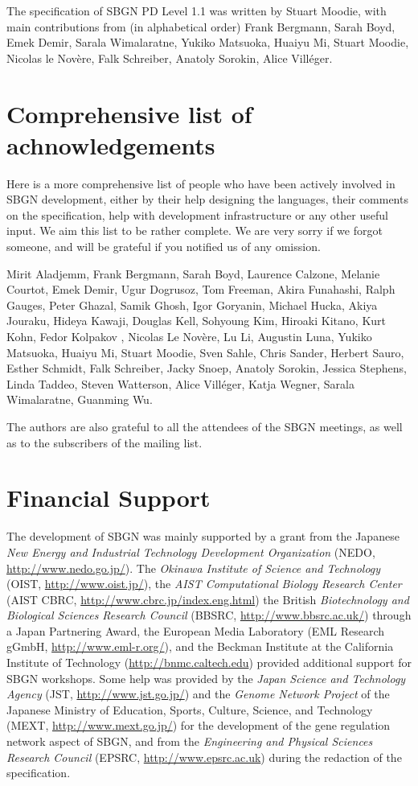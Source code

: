 The specification of SBGN PD Level 1.1 was written by Stuart Moodie, with 
main contributions from (in alphabetical order) Frank Bergmann, Sarah Boyd, 
Emek Demir, Sarala Wimalaratne, Yukiko Matsuoka, Huaiyu Mi, Stuart Moodie, 
Nicolas le Nov\`{e}re, Falk Schreiber, Anatoly Sorokin, Alice Vill\'{e}ger.

\section{Comprehensive list of achnowledgements}

Here is a more comprehensive list of people who have been actively involved 
in SBGN development, either by their help designing the languages, their 
comments on the specification, help with development infrastructure or any 
other useful input.  We aim this list to be rather complete. We are very 
sorry if we forgot someone, and will be grateful if you notified us of any 
omission.

Mirit Aladjemm, Frank Bergmann, Sarah Boyd, Laurence Calzone, Melanie 
Courtot, Emek Demir, Ugur Dogrusoz, Tom Freeman, Akira Funahashi, Ralph 
Gauges, Peter Ghazal, Samik Ghosh, Igor Goryanin, Michael Hucka, Akiya 
Jouraku, Hideya Kawaji, Douglas Kell, Sohyoung Kim, Hiroaki Kitano, Kurt 
Kohn, Fedor Kolpakov , Nicolas Le Nov\`{e}re, Lu Li, Augustin Luna, Yukiko 
Matsuoka, Huaiyu Mi, Stuart Moodie, Sven Sahle, Chris Sander, Herbert 
Sauro, Esther Schmidt, Falk Schreiber, Jacky Snoep, Anatoly Sorokin, 
Jessica Stephens, Linda Taddeo, Steven Watterson, Alice Vill\'{e}ger, Katja 
Wegner, Sarala Wimalaratne, Guanming Wu.

The authors are also grateful to all the attendees of the SBGN meetings, as 
well as to the subscribers of the  mailing list.


\section{Financial Support}

The development of SBGN was mainly supported by a grant from the Japanese \emph{New Energy and Industrial Technology Development Organization} (NEDO, \url{http://www.nedo.go.jp/}).  The \emph{Okinawa Institute of Science and Technology} (OIST, \url{http://www.oist.jp/}), the \emph{AIST Computational Biology Research Center} (AIST CBRC, \url{http://www.cbrc.jp/index.eng.html}) the British \emph{Biotechnology and Biological Sciences Research Council} (BBSRC, \url{http://www.bbsrc.ac.uk/}) through a Japan Partnering Award, the European Media Laboratory (EML Research gGmbH, \url{http://www.eml-r.org/}), and the Beckman Institute at the California Institute of Technology (\url{http://bnmc.caltech.edu}) provided additional support for SBGN workshops.  Some help was provided by the \emph{Japan Science and Technology Agency} (JST, \url{http://www.jst.go.jp/}) and the \emph{Genome Network Project} of the Japanese Ministry of Education, Sports, Culture, Science, and Technology (MEXT, \url{http://www.mext.go.jp/}) for the development of the gene regulation network aspect of SBGN, and from the \emph{Engineering and Physical Sciences Research Council} (EPSRC, \url{http://www.epsrc.ac.uk}) during the redaction of the specification.
